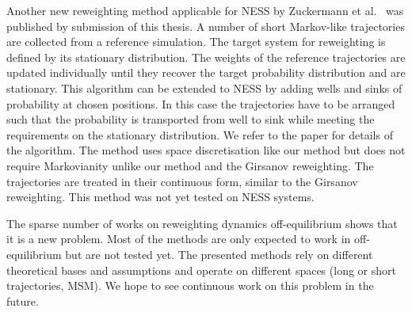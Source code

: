 Another new reweighting method applicable for NESS by Zuckermann et al.~\cite{russo2020iterative} was published by submission of this thesis. A number of short Markov-like trajectories are collected from a reference simulation. The target system for reweighting is defined by its stationary distribution. The weights of the reference trajectories are updated individually until they recover the target probability distribution and are stationary.  This algorithm can be extended to NESS by adding wells and sinks of probability at chosen positions. In this case the trajectories have to be arranged such that the probability is transported from well to sink while meeting the requirements on the stationary distribution. We refer to the paper for details of the algorithm. The method uses space discretisation like our method but does not require Markovianity unlike our method and the Girsanov reweighting. The trajectories are treated in their continuous form, similar to the Girsanov reweighting. This method was not yet tested on NESS systems.

The sparse number of works on reweighting dynamics off-equilibrium shows that it is a  new problem.  Most of the methods are only expected to work in off-equilibrium but are not tested yet. The presented methods rely on different theoretical bases and assumptions and operate on different spaces (long or short trajectories, MSM). We hope to see continuous work on this problem in the future.



% 
% 
% 
% 
% 

